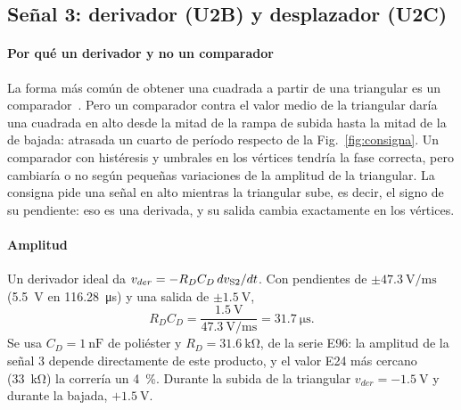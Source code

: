\subsection{Señal 3: derivador (U2B) y desplazador (U2C)}
\label{sec:derivador}
\paragraph*{Por qué un derivador y no un comparador} La forma más común de obtener una cuadrada a partir de una triangular es un comparador~\cite{linares-comp}. Pero un comparador contra el valor medio de la triangular daría una cuadrada en alto desde la mitad de la rampa de subida hasta la mitad de la de bajada: atrasada un cuarto de período respecto de la Fig.~\ref{fig:consigna}. Un comparador con histéresis y umbrales en los vértices tendría la fase correcta, pero cambiaría o no según pequeñas variaciones de la amplitud de la triangular. La consigna pide una señal en alto mientras la triangular sube, es decir, el signo de su pendiente: eso es una derivada, y su salida cambia exactamente en los vértices.

\paragraph*{Amplitud} Un derivador ideal da $v_{der} = -R_D C_D\, dv_{\mathrm{S2}}/dt$. Con pendientes de $\pm\SI{47,3}{\volt\per\milli\second}$ (\SI{5,5}{\volt} en \SI{116,28}{\micro\second}) y una salida de $\pm\SI{1,5}{\volt}$,
\begin{equation}
R_D C_D = \frac{\SI{1,5}{\volt}}{\SI{47,3}{\volt\per\milli\second}} = \SI{31,7}{\micro\second}.
\end{equation}
Se usa $C_D = \SI{1}{\nano\farad}$ de poliéster y $R_D = \SI{31,6}{\kilo\ohm}$, de la serie E96: la amplitud de la señal 3 depende directamente de este producto, y el valor E24 más cercano (\SI{33}{\kilo\ohm}) la correría un \SI{4}{\percent}. Durante la subida de la triangular $v_{der} = \SI{-1,5}{\volt}$ y durante la bajada, $+\SI{1,5}{\volt}$.

